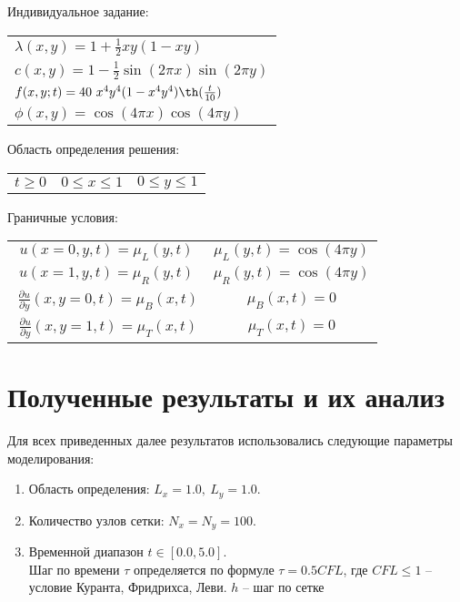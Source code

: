 \documentclass[12pt,a4paper]{article}
\begin{document}
	Индивидуальное задание:
	\begin{center}
		\begin{tabular}{l}
			$\lambda (x, y) = 1 + \frac{1}{2} xy(1 - xy)$\\
			$c(x, y) = 1 - \frac{1}{2} \sin(2 \pi x) \sin(2 \pi y)$ \\
			$f( x, y; t) = 40\ x^4 y^4 (1 - x^4 y^4) \th(\frac{t}{10})$\\
			$\phi( x, y) =  \cos(4\pi x) \cos(4 \pi y) $
		\end{tabular}
	\end{center}
	
	Область определения решения:
	\begin{center}
		\begin{tabular}{c c c }
			$	t \geq 0 $&
			$	0 \leq x \leq 1 $&
			$	0 \leq y \leq 1$
		\end{tabular}
	\end{center}
	Граничные условия:
	\begin{center}
		\begin{tabular}{c c }
			$u(x = 0, y, t) = \mu_L (y, t)$& $\mu_L (y, t) = \cos(4\pi y)$\\
			$u(x = 1, y, t) = \mu_R (y, t)$& $\mu_R (y, t) = \cos(4\pi y)$\\
			$\  \frac{\partial u }{\partial y} (x, y = 0, t) = \mu_B (x, t)$ &$\mu_B (x, t) = 0$\\
			$\  \frac{\partial u }{\partial y} (x, y = 1, t) = \mu_T (x, t)$ &$\mu_T (x, t) = 0$\\
		\end{tabular}
	\end{center}
	
	
	\newpage
	\section{Полученные результаты и их анализ}
	Для всех приведенных далее результатов использовались следующие параметры моделирования:
	\begin{enumerate}
		\item Область определения: $L_x = 1.0, \ L_y = 1.0.$
		\item Количество узлов сетки: $N_x = N_y = 100.$
		\item Временной диапазон $t \in [0.0, 5.0]$.\\ Шаг по времени $\tau$ определяется по формуле $\tau = 0.5 CFL$, где $CFL \leq 1$ -- условие Куранта, Фридрихса, Леви. $h$ -- шаг по сетке
	\end{enumerate}
\end{document}
